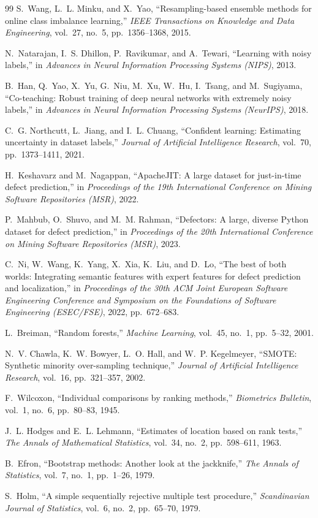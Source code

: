 \documentclass[12pt,a4paper,oneside]{report}
\begin{document}
{\begin{thebibliography}{99}
S.~Wang, L.~L. Minku, and X.~Yao, ``Resampling-based ensemble methods for
online class imbalance learning,'' \emph{IEEE Transactions on Knowledge and
Data Engineering}, vol.~27, no.~5, pp.~1356--1368, 2015.

N.~Natarajan, I.~S. Dhillon, P.~Ravikumar, and A.~Tewari, ``Learning with noisy
labels,'' in \emph{Advances in Neural Information Processing Systems (NIPS)},
2013.

B.~Han, Q.~Yao, X.~Yu, G.~Niu, M.~Xu, W.~Hu, I.~Tsang, and M.~Sugiyama,
``Co-teaching: Robust training of deep neural networks with extremely noisy
labels,'' in \emph{Advances in Neural Information Processing Systems
(NeurIPS)}, 2018.

C.~G. Northcutt, L.~Jiang, and I.~L. Chuang, ``Confident learning: Estimating
uncertainty in dataset labels,'' \emph{Journal of Artificial Intelligence
Research}, vol.~70, pp.~1373--1411, 2021.

H.~Keshavarz and M.~Nagappan, ``ApacheJIT: A large dataset for just-in-time
defect prediction,'' in \emph{Proceedings of the 19th International Conference
on Mining Software Repositories (MSR)}, 2022.

P.~Mahbub, O.~Shuvo, and M.~M. Rahman, ``Defectors: A large, diverse Python
dataset for defect prediction,'' in \emph{Proceedings of the 20th International
Conference on Mining Software Repositories (MSR)}, 2023.

C.~Ni, W.~Wang, K.~Yang, X.~Xia, K.~Liu, and D.~Lo, ``The best of both worlds:
Integrating semantic features with expert features for defect prediction and
localization,'' in \emph{Proceedings of the 30th ACM Joint European Software
Engineering Conference and Symposium on the Foundations of Software
Engineering (ESEC/FSE)}, 2022, pp.~672--683.

L.~Breiman, ``Random forests,'' \emph{Machine Learning}, vol.~45, no.~1,
pp.~5--32, 2001.

N.~V. Chawla, K.~W. Bowyer, L.~O. Hall, and W.~P. Kegelmeyer, ``SMOTE:
Synthetic minority over-sampling technique,'' \emph{Journal of Artificial
Intelligence Research}, vol.~16, pp.~321--357, 2002.

F.~Wilcoxon, ``Individual comparisons by ranking methods,'' \emph{Biometrics
Bulletin}, vol.~1, no.~6, pp.~80--83, 1945.

J.~L. Hodges and E.~L. Lehmann, ``Estimates of location based on rank tests,''
\emph{The Annals of Mathematical Statistics}, vol.~34, no.~2, pp.~598--611,
1963.

B.~Efron, ``Bootstrap methods: Another look at the jackknife,'' \emph{The
Annals of Statistics}, vol.~7, no.~1, pp.~1--26, 1979.

S.~Holm, ``A simple sequentially rejective multiple test procedure,''
\emph{Scandinavian Journal of Statistics}, vol.~6, no.~2, pp.~65--70, 1979.

\end{thebibliography}
}
\end{document}
